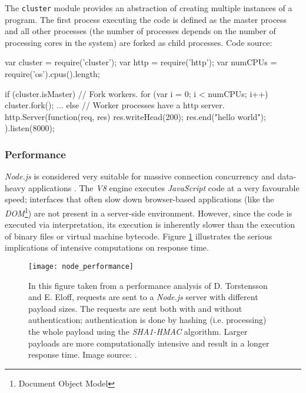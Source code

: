 \begin{program}
  \caption{The \texttt{cluster} module provides an abstraction of creating multiple instances of a program. The first process executing the code is defined as the master process and all other processes (the number of processes depends on the number of processing cores in the system) are forked as child processes. Code source: \cite{Hughes-Croucher2012}}
  \label{prog:cluster}
  \begin{JavaCode}
var cluster = require('cluster'); 
var http = require('http');
var numCPUs = require('os').cpus().length;

if (cluster.isMaster) {
    // Fork workers.
    for (var i = 0; i < numCPUs; i++) {
        cluster.fork();
    }
    ...
} else {
    // Worker processes have a http server.
    http.Server(function(req, res) {
        res.writeHead(200);
        res.end("hello world\n");
    }).listen(8000);
}
  \end{JavaCode}
\end{program}

\subsubsection*{Performance}
\textit{Node.js} is considered very suitable for massive connection concurrency and data-heavy applications \cite[p. 44]{Torstensson2012}. The \textit{V8} engine executes \textit{JavaScript} code at a very favourable speed; interfaces that often slow down browser-based applications (like the \textit{DOM}\footnote{Document Object Model}) are not present in a server-side environment. However, since the code is executed via interpretation, its execution is inherently slower than the execution of binary files or virtual machine bytecode. Figure \ref{fig:node_performance} illustrates the serious implications of intensive computations on response time. 

\begin{figure}
\centering\small
\setlength{\tabcolsep}{0mm}
  \texttt{[image: node\_performance]}
\caption{
In this figure taken from a performance analysis of D. Torstensson and E. Eloff, requests are sent to a \textit{Node.js} server with different payload sizes. The requests are sent both with and without authentication; authentication is done by hashing (i.e. processing) the whole payload using the \textit{SHA1-HMAC} algorithm. Larger payloads are more computationally intensive and result in a longer response time. Image source: \cite{Torstensson2012}.
}
\label{fig:node_performance}
\end{figure}

